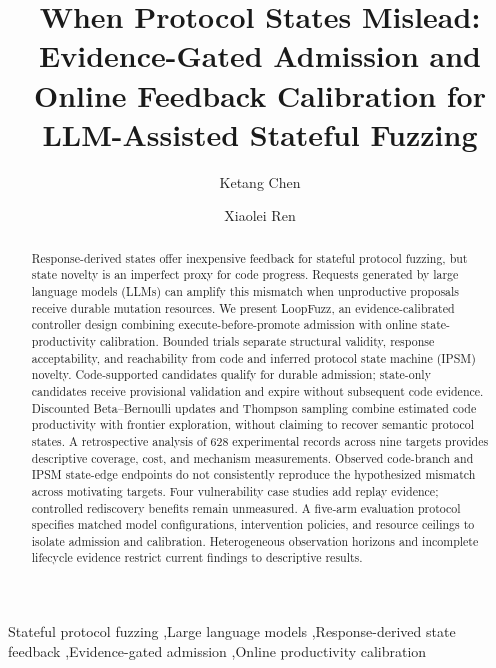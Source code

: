 \documentclass[final,5p,times,number]{elsarticle}
\begin{document}
\raggedbottom
\begin{frontmatter}
\title{When Protocol States Mislead: Evidence-Gated Admission and Online Feedback Calibration for LLM-Assisted Stateful Fuzzing}
\author[inst1]{Ketang Chen}
\author[inst1]{Xiaolei Ren}
\begin{abstract}
Response-derived states offer inexpensive feedback for stateful protocol fuzzing, but state novelty is an imperfect proxy for code progress. Requests generated by large language models (LLMs) can amplify this mismatch when unproductive proposals receive durable mutation resources. We present LoopFuzz, an evidence-calibrated controller design combining execute-before-promote admission with online state-productivity calibration. Bounded trials separate structural validity, response acceptability, and reachability from code and inferred protocol state machine (IPSM) novelty. Code-supported candidates qualify for durable admission; state-only candidates receive provisional validation and expire without subsequent code evidence. Discounted Beta--Bernoulli updates and Thompson sampling combine estimated code productivity with frontier exploration, without claiming to recover semantic protocol states. A retrospective analysis of 628 experimental records across nine targets provides descriptive coverage, cost, and mechanism measurements. Observed code-branch and IPSM state-edge endpoints do not consistently reproduce the hypothesized mismatch across motivating targets. Four vulnerability case studies add replay evidence; controlled rediscovery benefits remain unmeasured. A five-arm evaluation protocol specifies matched model configurations, intervention policies, and resource ceilings to isolate admission and calibration. Heterogeneous observation horizons and incomplete lifecycle evidence restrict current findings to descriptive results.
\end{abstract}
\begin{keyword}
Stateful protocol fuzzing \sep Large language models \sep Response-derived state feedback \sep Evidence-gated admission \sep Online productivity calibration
\end{keyword}
\end{frontmatter}
\end{document}
